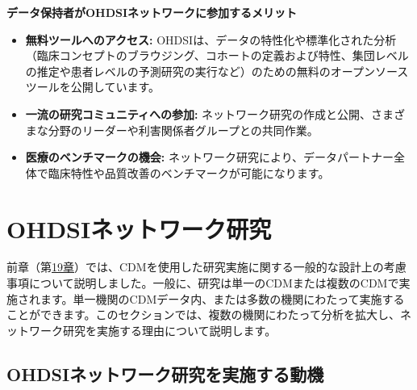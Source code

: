 \documentclass[
  11pt]{book}
\makeatletter
\providecommand{\tightlist}{%
  \setlength{\itemsep}{0pt}\setlength{\parskip}{0pt}}
\newenvironment{kframe}{%
\medskip{}
\setlength{\fboxsep}{.8em}
 \def\at@end@of@kframe{}%
 \ifinner\ifhmode%
  \def\at@end@of@kframe{\end{minipage}}%
  \begin{minipage}{\columnwidth}%
 \fi\fi%
 \def\FrameCommand##1{\hskip\@totalleftmargin \hskip-\fboxsep
 \colorbox{myShadeColor}{##1}\hskip-\fboxsep
     \hskip-\linewidth \hskip-\@totalleftmargin \hskip\columnwidth}%
 \MakeFramed {\advance\hsize-\width
   \@totalleftmargin\z@ \linewidth\hsize
   \@setminipage}}%
 {\par\unskip\endMakeFramed%
 \at@end@of@kframe}
\newenvironment{rmdblock}[1]
  {
  \begin{itemize}
  \renewcommand{\labelitemi}{
    \raisebox{-.7\height}[0pt][0pt]{
      {\setkeys{Gin}{width=3em,keepaspectratio}\texttt{[image: images/\#1]}}
    }
  }
  \setlength{\fboxsep}{1em}
  \begin{kframe}
  \item
  }
  {
  \end{kframe}
  \end{itemize}
  }
\newenvironment{rmdimportant}
  {\begin{rmdblock}{important}}
  {\end{rmdblock}}
\theoremstyle{definition}
\theoremstyle{definition}
\theoremstyle{definition}
\theoremstyle{definition}
\theoremstyle{remark}
\makeatother
\begin{document}
\begin{rmdimportant}
\textbf{データ保持者がOHDSIネットワークに参加するメリット}

\begin{itemize}
\tightlist
\item
  \textbf{無料ツールへのアクセス:} OHDSIは、データの特性化や標準化された分析（臨床コンセプトのブラウジング、コホートの定義および特性、集団レベルの推定や患者レベルの予測研究の実行など）のための無料のオープンソースツールを公開しています。
\item
  \textbf{一流の研究コミュニティへの参加:} ネットワーク研究の作成と公開、さまざまな分野のリーダーや利害関係者グループとの共同作業。
\item
  \textbf{医療のベンチマークの機会:} ネットワーク研究により、データパートナー全体で臨床特性や品質改善のベンチマークが可能になります。
\end{itemize}
\end{rmdimportant}

\section{OHDSIネットワーク研究}\label{ohdsiux30cdux30c3ux30c8ux30efux30fcux30afux7814ux7a76}


前章（第\href{https://ohdsi.github.io/TheBookOfOhdsi/StudySteps.html\#StudySteps}{19章}）では、CDMを使用した研究実施に関する一般的な設計上の考慮事項について説明しました。一般に、研究は単一のCDMまたは複数のCDMで実施されます。単一機関のCDMデータ内、または多数の機関にわたって実施することができます。このセクションでは、複数の機関にわたって分析を拡大し、ネットワーク研究を実施する理由について説明します。

\subsection{OHDSIネットワーク研究を実施する動機}\label{ohdsiux30cdux30c3ux30c8ux30efux30fcux30afux7814ux7a76ux3092ux5b9fux65bdux3059ux308bux52d5ux6a5f}
\end{document}
